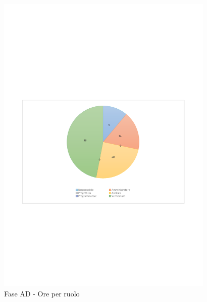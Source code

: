\documentclass[../PianoProgetto.tex]{subfiles}
\begin{document}
	\begin{figure}[H]
		\centering
		\includegraphics[width=0.93\textwidth , trim=1.5cm 9cm 1.5cm 9cm]{grafici/AD/AD-ore-ruolo}
			\caption{Fase AD - Ore per ruolo}
		\label{fig:CircleChart-faseAD_ore_r}
	\end{figure}
\vfill
\end{document}
